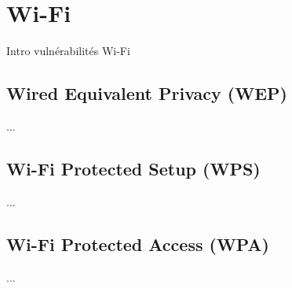

\newpage
\section{Wi-Fi}\label{vulnerabilites:physiques:wi-fi}

Intro vulnérabilités Wi-Fi

\subsection{Wired Equivalent Privacy (WEP)}\label{vulnerabilites:physiques:wi-fi:wep}

...

\subsection{Wi-Fi Protected Setup (WPS)}\label{vulnerabilites:physiques:wi-fi:wps}

...

\subsection{Wi-Fi Protected Access (WPA)}\label{vulnerabilites:physiques:wi-fi:wpa}

...

\endinput
